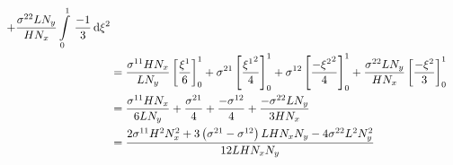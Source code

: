 \begin{equation}
\begin{aligned}
    +\dfrac{\conductivitytensorsymbol^{22} L N_{y}}{H N_{x}}\gint{0}{1}{\dfrac{-1}{3}}{\xitwo} \\
    &=\dfrac{\conductivitytensorsymbol^{11} H N_{x}}{L N_{y}}\sqbrac{\dfrac{\xione}{6}}^{1}_{0}
    +\conductivitytensorsymbol^{21}\sqbrac{\dfrac{\xionesq}{4}}^{1}_{0}
    +\conductivitytensorsymbol^{12}\sqbrac{\dfrac{-\xitwosq}{4}}^{1}_{0}
    +\dfrac{\conductivitytensorsymbol^{22} L N_{y}}{H N_{x}}\sqbrac{\dfrac{-\xitwo}{3}}^{1}_{0} \\
    &=\dfrac{\conductivitytensorsymbol^{11} H N_{x}}{6 L N_{y}}+\dfrac{\conductivitytensorsymbol^{21}}{4}+
    \dfrac{-\conductivitytensorsymbol^{12}}{4}+\dfrac{-\conductivitytensorsymbol^{22} L N_{y}}{3 H N_{x}} \\
    &=\dfrac{2\conductivitytensorsymbol^{11}H^{2}N_{x}^{2}+3\pbrac{\conductivitytensorsymbol^{21}-
        \conductivitytensorsymbol^{12}}L H N_{x} N_{y}-4\conductivitytensorsymbol^{22}L^{2}N_{y}^{2}}{12 L H N_{x} N_{y}}
  \end{aligned}
\end{equation}

